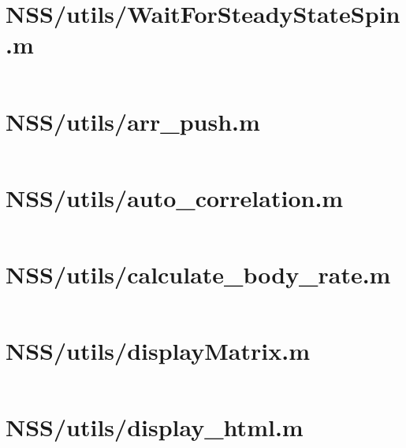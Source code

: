 \pagebreak
\section*{NSS/utils/WaitForSteadyStateSpin.m}\label{code:NSS/utils/WaitForSteadyStateSpin.m}
\inputminted[linenos,fontsize=\scriptsize]{matlab}{/home/dcouture/git/mathyourlife/TSatPy/beta_versions/matlab_object_oriented/utils/WaitForSteadyStateSpin.m}

\pagebreak
\section*{NSS/utils/arr\_push.m}\label{code:NSS/utils/arr_push.m}
\inputminted[linenos,fontsize=\scriptsize]{matlab}{/home/dcouture/git/mathyourlife/TSatPy/beta_versions/matlab_object_oriented/utils/arr_push.m}

\pagebreak
\section*{NSS/utils/auto\_correlation.m}\label{code:NSS/utils/auto_correlation.m}
\inputminted[linenos,fontsize=\scriptsize]{matlab}{/home/dcouture/git/mathyourlife/TSatPy/beta_versions/matlab_object_oriented/utils/auto_correlation.m}

\pagebreak
\section*{NSS/utils/calculate\_body\_rate.m}\label{code:NSS/utils/calculate_body_rate.m}
\inputminted[linenos,fontsize=\scriptsize]{matlab}{/home/dcouture/git/mathyourlife/TSatPy/beta_versions/matlab_object_oriented/utils/calculate_body_rate.m}

\pagebreak
\section*{NSS/utils/displayMatrix.m}\label{code:NSS/utils/displayMatrix.m}
\inputminted[linenos,fontsize=\scriptsize]{matlab}{/home/dcouture/git/mathyourlife/TSatPy/beta_versions/matlab_object_oriented/utils/displayMatrix.m}

\pagebreak
\section*{NSS/utils/display\_html.m}\label{code:NSS/utils/display_html.m}
\inputminted[linenos,fontsize=\scriptsize]{matlab}{/home/dcouture/git/mathyourlife/TSatPy/beta_versions/matlab_object_oriented/utils/display_html.m}

